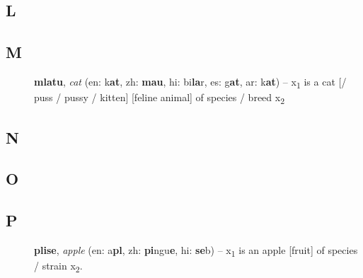 \documentclass[12pt]{book}
\begin{document}
\begin{description}
\item[ ]
\end{description}

\subsection{L} %

\begin{description}
\item[ ]
\end{description}

\subsection{M} %

\begin{description}
\item[ ] \textbf{mlatu}, \textit{cat} (en: k\textbf{at}, zh: \textbf{mau}, hi: bi\textbf{la}r, es: g\textbf{at}, ar: k\textbf{at}) -- x\textsubscript{1} is a cat [/ puss / pussy / kitten] [feline animal] of species / breed x\textsubscript{2}
\end{description}

\subsection{N} %

\begin{description}
\item[ ]
\end{description}

\subsection{O} %

\begin{description}
\item[ ]
\end{description}

\subsection{P} %

\begin{description}
\item[ ] \textbf{plise}, \textit{apple} (en: a\textbf{pl}, zh: \textbf{pi}ngu\textbf{e}, hi: \textbf{se}b) -- x\textsubscript{1} is an apple [fruit] of species / strain x\textsubscript{2}.
\end{description}
\end{document}
